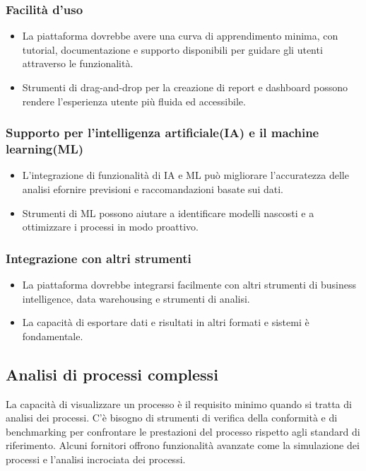 \documentclass{article}
\begin{document}
\subsubsection{Facilità d'uso}
\begin{itemize}
    \item La piattaforma dovrebbe avere una curva di apprendimento minima, con tutorial, documentazione e supporto disponibili per guidare gli utenti attraverso le funzionalità.
    \item Strumenti di drag-and-drop per la creazione di report e dashboard possono rendere l'esperienza utente più fluida ed accessibile.
\end{itemize}
\subsubsection{Supporto per l'intelligenza artificiale(IA) e il machine learning(ML)}
\begin{itemize}
    \item L'integrazione di funzionalità di IA e ML può migliorare l'accuratezza delle analisi efornire previsioni e raccomandazioni basate sui dati.
    \item Strumenti di ML possono aiutare a identificare modelli nascosti e a ottimizzare i processi in modo proattivo.
\end{itemize}
\subsubsection{Integrazione con altri strumenti}
\begin{itemize}
    \item La piattaforma dovrebbe integrarsi facilmente con altri strumenti di business intelligence, data warehousing e strumenti di analisi.
    \item La capacità di esportare dati e risultati in altri formati e sistemi è fondamentale.
\end{itemize}
\subsection{Analisi di processi complessi}
La capacità di visualizzare un processo è il requisito minimo quando si tratta di analisi dei processi. C'è bisogno di strumenti di verifica della conformità e di benchmarking per confrontare le prestazioni del processo rispetto agli standard di riferimento. Alcuni fornitori offrono funzionalità avanzate come la simulazione dei processi e l'analisi incrociata dei processi.
\end{document}
